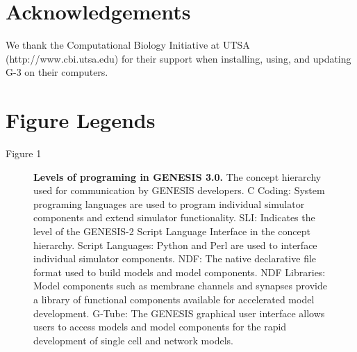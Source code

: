 \documentclass[10pt]{article}
\begin{document}
\section*{Acknowledgements}

We thank the Computational Biology Initiative at UTSA (http://www.cbi.utsa.edu) for their support when installing, using, and updating G-3 on their computers.



\newpage 



\newpage

\section*{Figure Legends}

Figure 1

\begin{figure}[ht]
\begin{center}
\end{center}
\caption{
{\bf Levels of programing in GENESIS 3.0.} The concept hierarchy used for communication by GENESIS developers. C Coding: System programing languages are used to program individual simulator components and extend simulator functionality. SLI: Indicates the level of the GENESIS-2 Script Language Interface in the concept hierarchy. Script Languages: Python and Perl are used to interface individual simulator components. NDF: The native declarative file format used to build models and model components. NDF Libraries: Model components such as membrane channels and synapses provide a library of functional components available for accelerated model development. G-Tube: The GENESIS graphical user interface allows users to access models and model components for the rapid development of single cell and network models.
}
\label{fig:g3-interfacing}
\end{figure}
\end{document}

